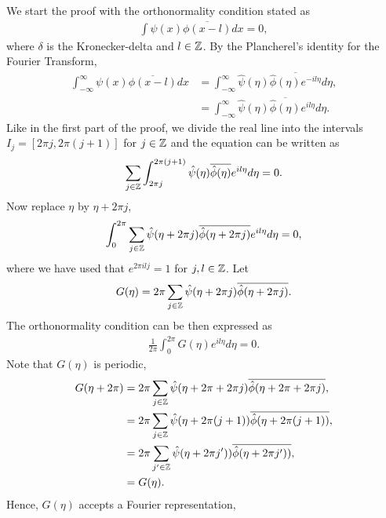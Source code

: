 \begin{questions}

\begin{solution}
We start the proof with the orthonormality condition stated as
\begin{align*}
\int\psi(x)\overline{\phi(x-l)}dx=0,
\end{align*}
where $\delta$ is the Kronecker-delta and $l\in\mathbb{Z}$. By the Plancherel's identity for the Fourier Transform,
\begin{align*}
\int_{-\infty}^{\infty}\psi(x)\overline{\phi(x-l)}dx&=\int_{-\infty}^{\infty}\hat{\psi}(\eta)\overline{\hat{\phi}(\eta)e^{-il\eta}} d\eta,\\
&=\int_{-\infty}^{\infty}\hat{\psi}(\eta)\overline{\hat{\phi}(\eta)}e^{il\eta} d\eta.
\end{align*}
Like in the first part of the proof, we divide the real line into the intervals $I_j=[2\pi j,2\pi(j+1)]$ for $j\in\mathbb{Z}$ and the equation can be written as
\begin{align*}
\sum_{j\in\mathbb{Z}}\int_{2\pi j}^{2\pi (j+1)}\hat{\psi}(\eta)\overline{\hat{\phi}(\eta)}e^{il\eta} d\eta=0.
\end{align*}
Now replace $\eta$ by $\eta+2\pi j$,
\begin{align*}
\int_{0}^{2\pi}\sum_{j\in\mathbb{Z}}\hat{\psi}(\eta+2\pi j)\overline{\hat{\phi}(\eta+2\pi j)}e^{il\eta} d\eta=0,
\end{align*}
where we have used that $e^{2\pi ilj}=1$ for $j,l\in\mathbb{Z}$. Let 
\begin{align*}
G(\eta)=2\pi\sum_{j\in\mathbb{Z}}\hat{\psi}(\eta+2\pi j)\overline{\hat{\phi}(\eta+2\pi j)}.
\end{align*}
The orthonormality condition can be then expressed as
\begin{align*}
\frac{1}{2\pi}\int_{0}^{2\pi}G(\eta)e^{il\eta} d\eta=0.
\end{align*}
Note that $G(\eta)$ is periodic,
\begin{align*}
G(\eta+2\pi)&=2\pi\sum_{j\in\mathbb{Z}}\hat{\psi}(\eta+2\pi+2\pi j)\overline{\hat{\phi}(\eta+2\pi+2\pi j)},\\
&=2\pi\sum_{j\in\mathbb{Z}}\hat{\psi}(\eta+2\pi (j+1))\overline{\hat{\phi}(\eta+2\pi (j+1))},\\
&=2\pi\sum_{j'\in\mathbb{Z}}\hat{\psi}(\eta+2\pi j'))\overline{\hat{\phi}(\eta+2\pi j'))},\\
&=G(\eta).
\end{align*}
Hence, $G(\eta)$ accepts a Fourier representation,

\end{solution}
\end{questions}
